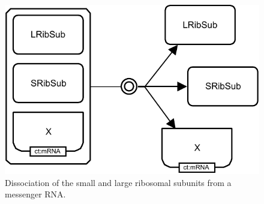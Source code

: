 \begin{figure}[H]
  \centering
  \includegraphics[scale = 0.8]{examples/dissociation-ribosome}
  \caption{Dissociation of the small and large ribosomal subunits from a messenger RNA.}
  \label{fig:dissoc-ribo}
\end{figure}

